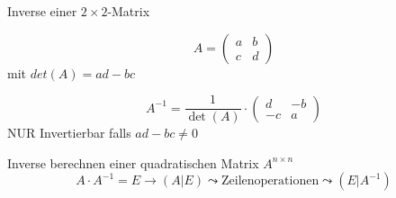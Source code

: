 \begin{theorem}{Inverse einer $2 \times 2$-Matrix}\\
    \begin{minipage}{0.45\linewidth}
    $$A = \begin{pmatrix} a & b \\ c & d \end{pmatrix}$$
    mit $det(A) = ad - bc$
    \end{minipage}
    \begin{minipage}{0.5\linewidth}
        $$A^{-1} = \frac{1}{\det(A)} \cdot \begin{pmatrix} d & -b \\ -c & a \end{pmatrix}$$
        NUR Invertierbar falls $ad - bc \neq 0$
    \end{minipage}
    
\end{theorem}

\begin{KR}{Inverse berechnen} einer quadratischen Matrix $A^{n \times n}$
    $$A \cdot A^{-1} = E \rightarrow \left( A | E \right) \leadsto \text{Zeilenoperationen} \leadsto \left( E | A^{-1}\right)$$
\end{KR}

